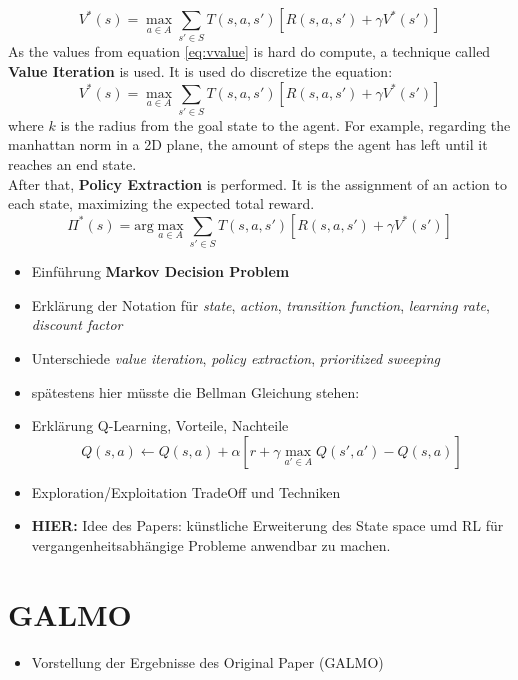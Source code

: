 \documentclass[a4paper]{article}
\begin{document}
	\begin{equation}\label{eq:vvalue}
		V^*(s) = \max_{a \in A} \sum_{s' \in S}^{} T(s,a,s')[R(s,a,s')+\gamma V^*(s')]
	\end{equation}
	As the values from equation \ref{eq:vvalue} is hard do compute, a technique called \textbf{Value Iteration} is used. It is used do discretize the equation: 
	\begin{equation}\label{eq:value-iteration}
		V^*(s) = \max_{a \in A} \sum_{s' \in S}^{} T(s,a,s')[R(s,a,s')+\gamma V^*(s')]
	\end{equation}
	where $k$ is the radius from the goal state to the agent. For example, regarding the manhattan norm in a 2D plane, the amount of steps the agent has left until it reaches an end state.\\
	After that, \textbf{Policy Extraction} is performed. It is the assignment of an action to each state, maximizing the expected total reward.
	\begin{equation}
		\Pi^*(s) = \text{arg}\max_{a \in A} \sum_{s' \in S}^{} T(s,a,s')[R(s,a,s')+\gamma V^*(s')]
	\end{equation}
	\begin{itemize}
		\item Einführung \textbf{Markov Decision Problem}
		\item Erklärung der Notation für \textit{state}, \textit{action}, \textit{transition function}, \textit{learning rate}, \textit{discount factor}
		\item Unterschiede \textit{value iteration}, \textit{policy extraction}, \textit{prioritized sweeping}
		\item spätestens hier müsste die Bellman Gleichung stehen:
		
		\item Erklärung Q-Learning, Vorteile, Nachteile
		$$Q(s,a) \leftarrow Q(s,a) + \alpha[r + \gamma \max_{a' \in A}Q(s',a')-Q(s,a)]$$
		\item Exploration/Exploitation TradeOff und Techniken
		\item \textbf{HIER:} Idee des Papers: künstliche Erweiterung des State space umd RL für vergangenheitsabhängige Probleme anwendbar zu machen.
	\end{itemize}
	
	
	\section{GALMO}
	\label{sec:galmo}
	\begin{itemize}
		\item Vorstellung der Ergebnisse des Original Paper (GALMO)
	\end{itemize}
	
\end{document}
